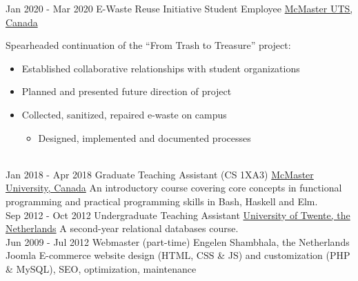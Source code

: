 \documentclass[letterpaper]{twentysecondcv} %
\begin{document}
\begin{twenty}
  \twentyitem
  {Jan 2020 -}
  {Mar 2020}
  {E-Waste Reuse Initiative Student Employee}
  {\href{https://uts.mcmaster.ca/}{McMaster UTS, Canada}}
  {}
  {Spearheaded continuation of the ``From Trash to Treasure'' project:
    \begin{itemize}
      \item Established collaborative relationships with student organizations
      \item Planned and presented future direction of project
      \item Collected, sanitized, repaired e-waste on campus
      \begin{itemize}
        \item Designed, implemented and documented processes
      \end{itemize}
    \end{itemize}
  }
  \\
  \twentyitem
  {Jan 2018 -}
  {Apr 2018}
  {Graduate Teaching Assistant (CS 1XA3)}
  {\href{https://www.mcmaster.ca/}{McMaster University, Canada}}
  {}
  {An introductory course covering core concepts in functional programming and practical programming skills in Bash, Haskell and Elm.
}
	\\
	\twentyitem
	{Sep 2012 -}
	{Oct 2012}
	{Undergraduate Teaching Assistant}
	{\href{https://www.utwente.nl/}{University of Twente, the Netherlands}}
	{}
	{A second-year relational databases course.
  }
  \\
	\twentyitem
	{Jun 2009 -}
	{Jul 2012}
	{Webmaster (part-time)}
	{Engelen Shambhala, the Netherlands}
	{}
	{Joomla E-commerce website design (HTML, CSS \& JS) and customization (PHP \& MySQL), SEO, optimization, maintenance
  }
\end{twenty}
\vspace{-.5em}

\end{document}
